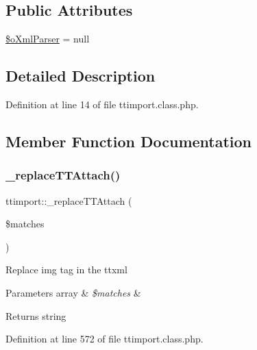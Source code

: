 \subsection*{Public Attributes}
\begin{DoxyCompactItemize}
\item 
\hyperlink{classttimport_af3932f8dbd65a917d2d41e001bae4e87}{\$o\+Xml\+Parser} = null
\end{DoxyCompactItemize}


\subsection{Detailed Description}


Definition at line 14 of file ttimport.\+class.\+php.



\subsection{Member Function Documentation}
\mbox{\label{classttimport_a14327afa66ec130f1a0be24a7b5c7160}} 
\subsubsection{\texorpdfstring{\+\_\+replace\+T\+T\+Attach()}{\_replaceTTAttach()}}
{\footnotesize\ttfamily ttimport\+::\+\_\+replace\+T\+T\+Attach (\begin{DoxyParamCaption}\item[{}]{\$matches }\end{DoxyParamCaption})}

Replace img tag in the ttxml 
\begin{DoxyParams}[1]{Parameters}
array & {\em \$matches} & \\
\hline
\end{DoxyParams}
\begin{DoxyReturn}{Returns}
string 
\end{DoxyReturn}


Definition at line 572 of file ttimport.\+class.\+php.

\mbox{\label{classttimport_a30eac1bf295a9bfd0a7bc60292a07f06}} 
